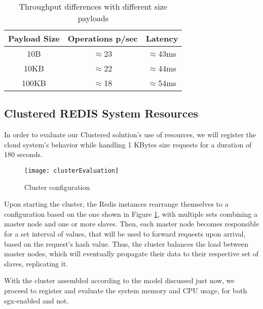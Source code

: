 \begin{table}[ht]
	\caption{Throughput differences with different size payloads} %
	\centering %
	\begin{tabular}{c c c } %
		\hline\hline %
		\textbf{Payload Size} & \textbf{Operations p/sec} & \textbf{Latency}\\ [0.5ex] %
		\hline
		10B & $\approx$23 & $\approx$43ms\\
		\hline
		10KB & $\approx$22 & $\approx$44ms\\
		\hline %
		100KB & $\approx$18 & $\approx$54ms\\ [1ex] %
		\hline %
	\end{tabular}
	\label{table:throughputPayloadsCluster} %
\end{table} 




\subsection{Clustered REDIS System Resources}

In order to evaluate our Clustered solution's use of resources, we will register the cloud system's behavior while handling 1 KBytes size requests for a duration of 180 seconds.

\begin{figure}[htbp]
	\centering
	{\texttt{[image: clusterEvaluation]}}
	\caption{Cluster configuration}
	\label{fig:clusterLayout}
\end{figure} 

Upon starting the cluster, the Redis instances rearrange themselves to a configuration based on the one shown in Figure \ref{fig:clusterLayout}, with multiple sets combining a master node and one or more slaves. Then, each master node becomes responsible for a set interval of values, that will be used to forward requests upon arrival, based on the request's hash value. Thus, the cluster balances the load between master nodes, which will eventually propagate their data to their respective set of slaves, replicating it.
 
With the cluster assembled according to the model discussed just now, we proceed to register and evaluate the system memory and CPU usage, for both \gls{sgx}-enabled and not.

